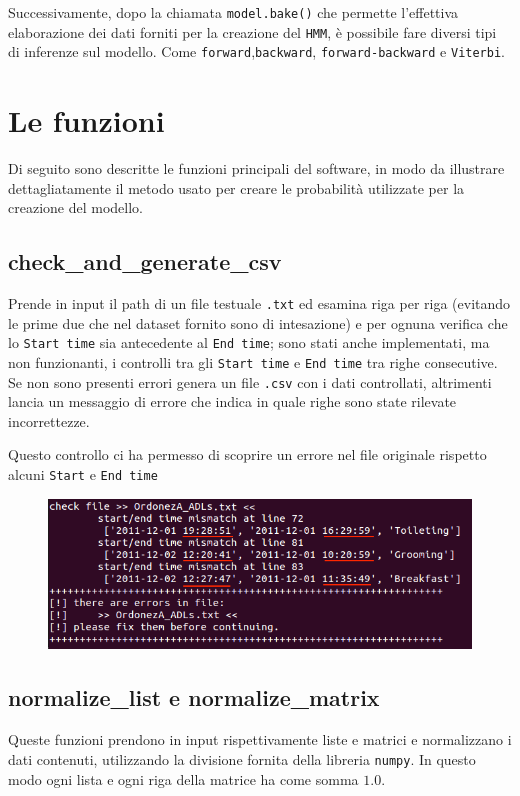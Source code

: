 \documentclass[12pt, a4paper]{scrartcl}
\begin{document}
Successivamente, dopo la chiamata \texttt{model.bake()} che permette l'effettiva elaborazione dei dati forniti per la creazione del \texttt{HMM}, è possibile fare diversi tipi di inferenze sul modello. Come \texttt{forward},\texttt{backward}, \texttt{forward-backward} e \texttt{Viterbi}.

\section*{Le funzioni}
Di seguito sono descritte le funzioni principali del software, in modo da illustrare dettagliatamente il metodo usato per creare le probabilità utilizzate per la creazione del modello.

\subsection*{check\_and\_generate\_csv}
Prende in input il path di un file testuale \texttt{.txt} ed esamina riga per riga (evitando le prime due che nel dataset fornito sono di intesazione) e per ognuna verifica che lo \texttt{Start time} sia antecedente al \texttt{End time}; sono stati anche implementati, ma non funzionanti, i controlli tra gli \texttt{Start time} e \texttt{End time} tra righe consecutive. Se non sono presenti errori genera un file \texttt{.csv} con i dati controllati, altrimenti lancia un messaggio di errore che indica in quale righe sono state rilevate incorrettezze.

Questo controllo ci ha permesso di scoprire un errore nel file originale rispetto alcuni \texttt{Start} e \texttt{End time}
\begin{figure}[!ht]
	\centering
	\includegraphics[scale=0.6]{error.png} 
	\label{fig:error}
\end{figure}

\subsection*{normalize\_list e normalize\_matrix}
Queste funzioni prendono in input rispettivamente liste e matrici e normalizzano i dati contenuti, utilizzando la divisione fornita della libreria \texttt{numpy}. In questo modo ogni lista e ogni riga della matrice ha come somma $1.0$.
\end{document}
